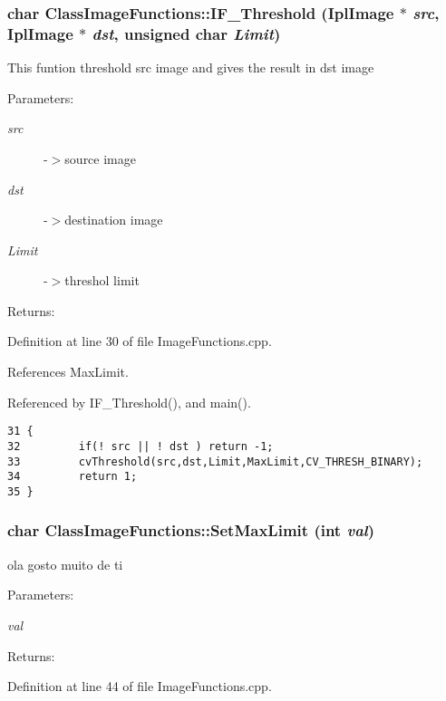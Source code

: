 \subsubsection{\setlength{\rightskip}{0pt plus 5cm}char Class\-Image\-Functions::IF\_\-Threshold (Ipl\-Image $\ast$ {\em src}, Ipl\-Image $\ast$ {\em dst}, unsigned char {\em Limit})}\label{classClassImageFunctions_ClassImageFunctionsa2}


This funtion threshold src image and gives the result in dst image \begin{Desc}
\item[Parameters:]
\begin{description}
\item[{\em src}]-$>$source image \item[{\em dst}]-$>$destination image \item[{\em Limit}]-$>$threshol limit \end{description}
\end{Desc}
\begin{Desc}
\item[Returns:]\end{Desc}
Definition at line 30 of file Image\-Functions.cpp.

References Max\-Limit.

Referenced by IF\_\-Threshold(), and main().

\footnotesize\begin{verbatim}31 {
32         if(! src || ! dst ) return -1;
33         cvThreshold(src,dst,Limit,MaxLimit,CV_THRESH_BINARY);
34         return 1;
35 }       
\end{verbatim}\normalsize 


\subsubsection{\setlength{\rightskip}{0pt plus 5cm}char Class\-Image\-Functions::Set\-Max\-Limit (int {\em val})}\label{classClassImageFunctions_ClassImageFunctionsa4}


ola gosto muito de ti \begin{Desc}
\item[Parameters:]
\begin{description}
\item[{\em val}]\end{description}
\end{Desc}
\begin{Desc}
\item[Returns:]\end{Desc}
Definition at line 44 of file Image\-Functions.cpp.

